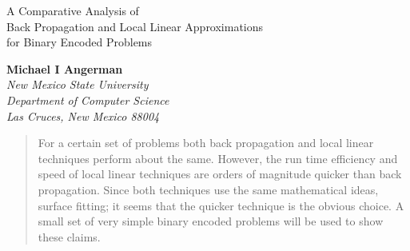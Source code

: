 
\pagestyle{empty}


\begin{center}
\Large

{\bf} A Comparative Analysis of\\
Back Propagation and Local Linear Approximations\\
for Binary Encoded Problems\\[.35in]

\normalsize

{\bf Michael I Angerman}\\[.05in]
        {\small \sl New Mexico State University}\\
        {\small \sl Department of Computer Science}\\
        {\small \sl Las Cruces, New Mexico 88004}\\[.35in]

\end{center}

\begin{abstract}
	For a certain set of problems both back propagation and local
linear techniques perform about the same.  However, the run time
efficiency and speed of local linear techniques are orders of
magnitude quicker than back propagation.  Since both techniques use
the same mathematical ideas, surface fitting; it seems that the
quicker technique is the obvious choice.  A small set of very simple
binary encoded problems will be used to show these claims.

\end{abstract}

